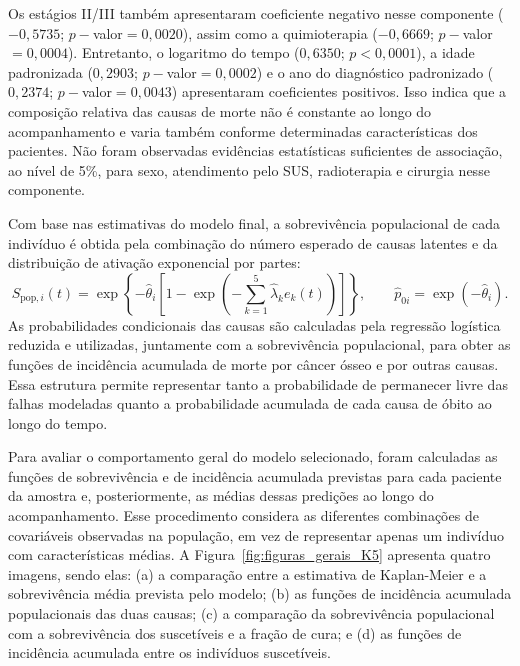 \documentclass[11pt,a4paper]{article}
\begin{document}
Os estágios II/III também apresentaram coeficiente negativo nesse componente ($-0{,}5735$; $p-$valor$=0{,}0020$), assim como a quimioterapia ($-0{,}6669$; $p-$valor$=0{,}0004$). Entretanto, o logaritmo do tempo ($0{,}6350$; $p<0{,}0001$), a idade padronizada ($0{,}2903$; $p-$valor$=0{,}0002$) e o ano do diagnóstico padronizado ($0{,}2374$; $p-$valor$=0{,}0043$) apresentaram coeficientes positivos. Isso indica que a composição relativa das causas de morte não é constante ao longo do acompanhamento e varia também conforme determinadas características dos pacientes. Não foram observadas evidências estatísticas suficientes de associação, ao nível de 5\%, para sexo, atendimento pelo SUS, radioterapia e cirurgia nesse componente. 

Com base nas estimativas do modelo final, a sobrevivência populacional de cada indivíduo é obtida pela combinação do número esperado de causas latentes e da distribuição de ativação exponencial por partes:
\begin{equation}
\widehat S_{\mathrm{pop},i}(t)
=\exp\!\left\{-\widehat\theta_i
\left[1-\exp\!\left(-\sum_{k=1}^{5}\widehat\lambda_k e_k(t)\right)\right]\right\},
\qquad
\widehat p_{0i}=\exp(-\widehat\theta_i).
\label{eq:aplicacao_pred_sobrevivencia}
\end{equation}
As probabilidades condicionais das causas são calculadas pela regressão logística reduzida e utilizadas, juntamente com a sobrevivência populacional, para obter as funções de incidência acumulada de morte por câncer ósseo e por outras causas. Essa estrutura permite representar tanto a probabilidade de permanecer livre das falhas modeladas quanto a probabilidade acumulada de cada causa de óbito ao longo do tempo.

Para avaliar o comportamento geral do modelo selecionado, foram calculadas as funções de sobrevivência e de incidência acumulada previstas para cada paciente da amostra e, posteriormente, as médias dessas predições ao longo do acompanhamento. Esse procedimento considera as diferentes combinações de covariáveis observadas na população, em vez de representar apenas um indivíduo com características médias. A Figura~\ref{fig:figuras_gerais_K5} apresenta quatro imagens, sendo elas: (a) a comparação entre a estimativa de Kaplan-Meier e a sobrevivência média prevista pelo modelo; (b) as funções de incidência acumulada populacionais das duas causas; (c) a comparação da sobrevivência populacional com a sobrevivência dos suscetíveis e a fração de cura; e (d) as funções de incidência acumulada entre os indivíduos suscetíveis. 
\end{document}
